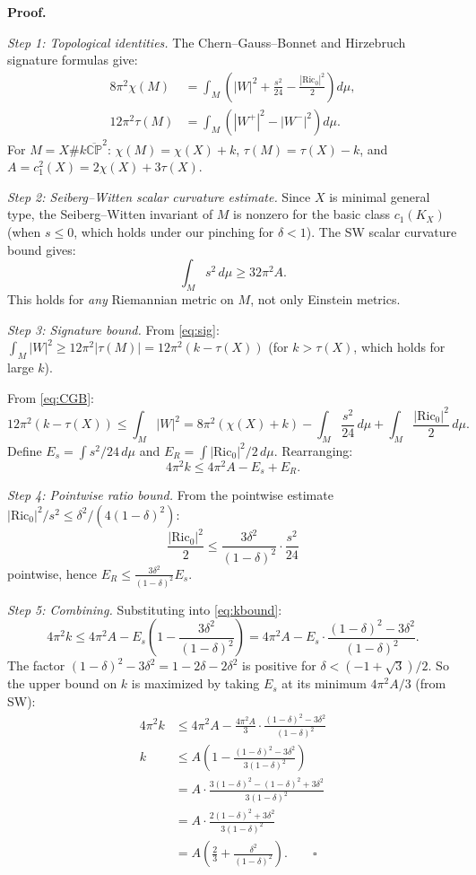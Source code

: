\textbf{Proof.}

\textit{Step 1: Topological identities.} The Chern--Gauss--Bonnet and Hirzebruch 
signature formulas give:
\begin{align}
8\pi^2 \chi(M) &= \int_M \left(|W|^2 + \frac{s^2}{24} - \frac{|\mathrm{Ric}_0|^2}{2}\right) d\mu, \label{eq:CGB}\\
12\pi^2 \tau(M) &= \int_M \left(|W^+|^2 - |W^-|^2\right) d\mu. \label{eq:sig}
\end{align}
For $M = X \# k\overline{\mathbb{CP}}^2$: $\chi(M) = \chi(X) + k$, $\tau(M) = \tau(X) - k$,
and $A = c_1^2(X) = 2\chi(X) + 3\tau(X)$.

\textit{Step 2: Seiberg--Witten scalar curvature estimate.}
Since $X$ is minimal general type, the Seiberg--Witten invariant of $M$ is nonzero
for the basic class $c_1(K_X)$ (when $s \leq 0$, which holds under our pinching for $\delta < 1$).
The SW scalar curvature bound gives:
\[
\int_M s^2 \, d\mu \geq 32\pi^2 A. \tag{SW}
\]
This holds for \emph{any} Riemannian metric on $M$, not only Einstein metrics.

\textit{Step 3: Signature bound.}
From \eqref{eq:sig}: $\int_M |W|^2 \geq 12\pi^2 |\tau(M)| = 12\pi^2(k - \tau(X))$
(for $k > \tau(X)$, which holds for large $k$).

From \eqref{eq:CGB}:
\[
12\pi^2(k - \tau(X)) \leq \int_M |W|^2 = 8\pi^2(\chi(X)+k) - \int_M \frac{s^2}{24}\,d\mu + \int_M \frac{|\mathrm{Ric}_0|^2}{2}\,d\mu.
\]
Define $E_s = \int s^2/24\,d\mu$ and $E_R = \int |\mathrm{Ric}_0|^2/2\,d\mu$.
Rearranging:
\begin{equation}
4\pi^2 k \leq 4\pi^2 A - E_s + E_R. \label{eq:kbound}
\end{equation}

\textit{Step 4: Pointwise ratio bound.}
From the pointwise estimate $|\mathrm{Ric}_0|^2/s^2 \leq \delta^2/(4(1-\delta)^2)$:
\[
\frac{|\mathrm{Ric}_0|^2}{2} \leq \frac{3\delta^2}{(1-\delta)^2} \cdot \frac{s^2}{24}
\]
pointwise, hence $E_R \leq \frac{3\delta^2}{(1-\delta)^2} E_s$.

\textit{Step 5: Combining.}
Substituting into \eqref{eq:kbound}:
\[
4\pi^2 k \leq 4\pi^2 A - E_s\left(1 - \frac{3\delta^2}{(1-\delta)^2}\right)
= 4\pi^2 A - E_s \cdot \frac{(1-\delta)^2 - 3\delta^2}{(1-\delta)^2}.
\]
The factor $(1-\delta)^2 - 3\delta^2 = 1 - 2\delta - 2\delta^2$ is positive for $\delta < (-1+\sqrt{3})/2$.
So the upper bound on $k$ is maximized by taking $E_s$ at its minimum $4\pi^2 A/3$ (from SW):
\begin{align}
4\pi^2 k &\leq 4\pi^2 A - \frac{4\pi^2 A}{3} \cdot \frac{(1-\delta)^2 - 3\delta^2}{(1-\delta)^2} \\
k &\leq A\left(1 - \frac{(1-\delta)^2 - 3\delta^2}{3(1-\delta)^2}\right) \\
&= A \cdot \frac{3(1-\delta)^2 - (1-\delta)^2 + 3\delta^2}{3(1-\delta)^2} \\
&= A \cdot \frac{2(1-\delta)^2 + 3\delta^2}{3(1-\delta)^2} \\
&= A\left(\frac{2}{3} + \frac{\delta^2}{(1-\delta)^2}\right). \qquad \square
\end{align}

